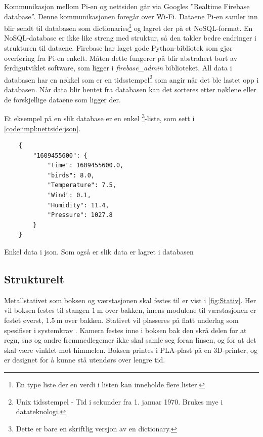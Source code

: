 Kommunikasjon mellom Pi-en og nettsiden går via Googles ''Realtime Firebase database''. 
Denne kommunikasjonen foregår over Wi-Fi. 
Dataene Pi-en samler inn blir sendt til databasen som dictionaries\footnote{En type liste der en verdi i listen kan inneholde flere lister.}\cite{dictionaries} og lagret der på et NoSQL-format. 
En NoSQL-database er ikke like streng med struktur, så den takler bedre endringer i strukturen til dataene. 
Firebase har laget gode Python-bibliotek som gjør overføring fra Pi-en enkelt. 
Måten dette fungerer på blir abstrahert bort av ferdigutviklet software, som ligger i \textit{firebase\_admin} biblioteket. 
All data i databasen har en nøkkel som er en tidsstempel\footnote{Unix tidsstempel - Tid i sekunder fra 1. januar 1970. Brukes mye i datateknologi.} som angir når det ble lastet opp i databasen. 
Når data blir hentet fra databasen kan det sorteres etter nøklene eller de forskjellige dataene som ligger der.

Et eksempel på en slik database er en enkel \footnote{Dette er bare en skriftlig versjon av en dictionary.}-liste, som sett i \autoref{code:impl:nettside:json}.

\begin{listing}[!htb]
    \begin{verbatim}
    {
        "1609455600": {
            "time": 1609455600.0, 
            "birds": 8.0, 
            "Temperature": 7.5, 
            "Wind": 0.1, 
            "Humidity": 11.4, 
            "Pressure": 1027.8
        }  
    }
    \end{verbatim}
    \caption{Enkel data i json. Som også er slik data er lagret i databasen}
    \label{code:impl:nettside:json}
\end{listing}


\subsection{Strukturelt}\label{sec:impl:struktur}

Metallstativet som boksen og værstasjonen skal festes til er vist i \autoref{fig:Stativ}. 
Her vil boksen festes til stangen $\SI{1}{\meter}$ over bakken, imens modulene til værstasjonen er festet øverst, $\SI{1.5}{\meter}$ over bakken. 
Stativet vil plasseres på flatt underlag som spesifiser i systemkrav . 
Kamera festes inne i boksen bak den skrå delen for at regn, snø og andre fremmedlegemer ikke skal samle seg foran linsen, og for at det skal være vinklet mot himmelen. 
Boksen printes i PLA-plast på en 3D-printer, og er designet for å kunne stå utendørs over lengre tid.

